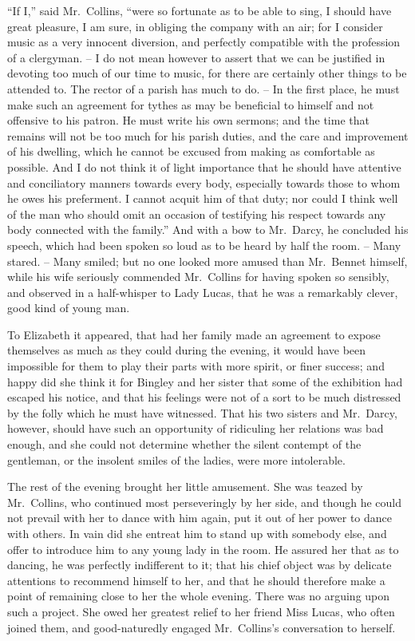 “If I,” said Mr.\ Collins, “were so fortunate as to be
able to sing, I should have great pleasure, I am sure, in
obliging the company with an air; for I consider music
as a very innocent diversion, and perfectly compatible
with the profession of a clergyman. -- I do not mean however
to assert that we can be justified in devoting too much
of our time to music, for there are certainly other things
to be attended to. The rector of a parish has much to do. --
In the first place, he must make such an agreement for
tythes as may be beneficial to himself and not offensive
to his patron. He must write his own sermons; and the
time that remains will not be too much for his parish
duties, and the care and improvement of his dwelling,
which he cannot be excused from making as comfortable
as possible. And I do not think it of light importance that
he should have attentive and conciliatory manners towards
every body, especially towards those to whom he owes
his preferment. I cannot acquit him of that duty; nor
could I think well of the man who should omit an occasion
of testifying his respect towards any body connected with
the family.” And with a bow to Mr.\ Darcy, he concluded
his speech, which had been spoken so loud as to be heard
by half the room. -- Many stared. -- Many smiled; but no
one looked more amused than Mr.\ Bennet himself, while
his wife seriously commended Mr.\ Collins for having spoken
so sensibly, and observed in a half-whisper to Lady Lucas,
that he was a remarkably clever, good kind of young man.

To Elizabeth it appeared, that had her family made
an agreement to expose themselves as much as they
could during the evening, it would have been impossible
for them to play their parts with more spirit, or finer
success; and happy did she think it for Bingley and her
sister that some of the exhibition had escaped his notice,
and that his feelings were not of a sort to be much distressed
by the folly which he must have witnessed. That
his two sisters and Mr.\ Darcy, however, should have such
an opportunity of ridiculing her relations was bad enough,
and she could not determine whether the silent contempt
of the gentleman, or the insolent smiles of the ladies, were
more intolerable.

The rest of the evening brought her little amusement.
She was teazed by Mr.\ Collins, who continued most perseveringly
by her side, and though he could not prevail
with her to dance with him again, put it out of her power
to dance with others. In vain did she entreat him to stand
up with somebody else, and offer to introduce him to any
young lady in the room. He assured her that as to dancing,
he was perfectly indifferent to it; that his chief object
was by delicate attentions to recommend himself to her,
and that he should therefore make a point of remaining
close to her the whole evening. There was no arguing
upon such a project. She owed her greatest relief to her
friend Miss Lucas, who often joined them, and good-naturedly
engaged Mr.\ Collins’s conversation to herself.

